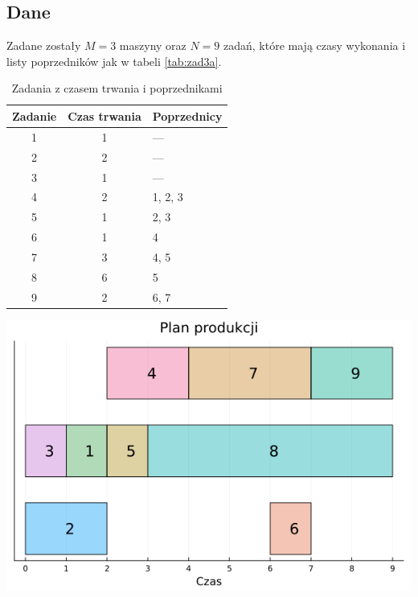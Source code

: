 \documentclass{article}
\begin{document}
\subsection{Dane}
Zadane zostały $M = 3$ maszyny oraz $N = 9$ zadań, które mają czasy wykonania i listy poprzedników jak w tabeli \ref{tab:zad3a}.
\begin{table}[h]
    \centering
    \begin{minipage}{0.4\textwidth}
        \centering
        \begin{tabular}{c|c|l}
            Zadanie & Czas trwania & Poprzednicy \\
            \hline
            1 & 1 & --- \\
            2 & 2 & --- \\
            3 & 1 & --- \\
            4 & 2 & 1, 2, 3 \\
            5 & 1 & 2, 3 \\
            6 & 1 & 4 \\
            7 & 3 & 4, 5 \\
            8 & 6 & 5 \\
            9 & 2 & 6, 7 \\
        \end{tabular}
        \caption{Zadania z czasem trwania i poprzednikami}
        \label{tab:zad3a}
    \end{minipage}
    \hfill
    \begin{minipage}{0.4\textwidth}
        \centering
        \includegraphics[width=\linewidth]{../produkcja_na_wielu_maszynach/wynik.png}
        \label{fig:zad3b}
    \end{minipage}
\end{table}
\end{document}
